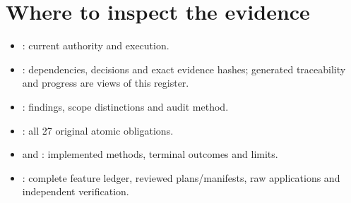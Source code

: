 \section{Where to inspect the evidence}

\begin{itemize}[leftmargin=*]
\item {}: current authority and execution.
\item {}: dependencies, decisions and exact
evidence hashes; generated traceability and progress are views of this register.
\item {}: findings,
scope distinctions and audit method.
\item {}: all 27 original atomic obligations.
\item {} and :
implemented methods, terminal outcomes and limits.
\item {}:\newline
complete feature ledger, reviewed plans/manifests, raw applications and
independent verification.
\end{itemize}
